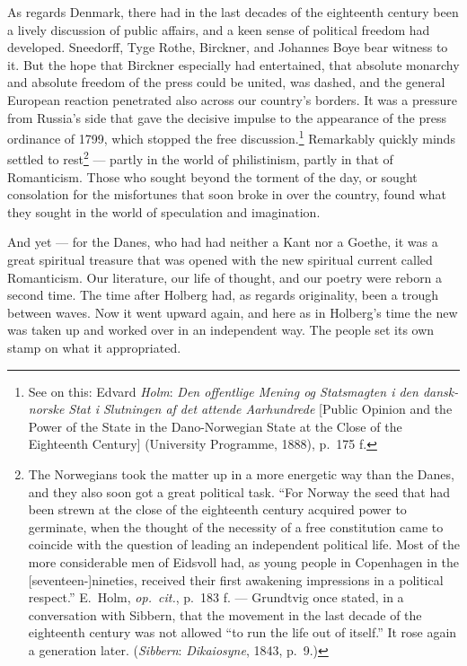 \documentclass[12pt,a4paper]{book}
\newcommand{\opage}[1]{\marginnote{\footnotesize\textit{[#1]}}}
\begin{document}

As regards Denmark, there had in the last decades of the eighteenth century been a
lively discussion of public affairs, and a keen sense of political freedom had
developed. Sneedorff, Tyge Rothe, Birckner, and Johannes Boye bear witness to it.
But the hope that Birckner especially had entertained, that absolute monarchy and
absolute freedom of the press could be united, was dashed, and the general European
reaction penetrated also across our country's borders. It was a pressure from
Russia's side that gave the decisive impulse to the appearance of the press
ordinance of 1799, which stopped the free discussion.\footnote{See on this: Edvard
\emph{Holm}: \emph{Den offentlige Mening og Statsmagten i den dansk-norske Stat i
Slutningen af det attende Aarhundrede} [Public Opinion and the Power of the State in
the Dano-Norwegian State at the Close of the Eighteenth Century] (University
Programme, 1888), p.~175 f.} Remarkably quickly minds settled to rest\footnote{The
Norwegians took the matter up in a more energetic way than the Danes, and they also
soon got a great political task. ``For Norway the seed that had been strewn at the
close of the eighteenth century acquired power to germinate, when the thought of the
necessity of a free constitution came to coincide with the question of leading an
independent political life. Most of the more considerable men of Eidsvoll had, as
young people in Copenhagen in the [seventeen-]nineties, received their first
awakening impressions in a political respect.'' E.\ Holm, \emph{op.\ cit.}, p.~183
f. --- Grundtvig once stated, in a conversation with Sibbern, that the movement in
the last decade of the eighteenth century was not allowed ``to run the life out of
itself.'' It rose again a generation later. (\emph{Sibbern}: \emph{Dikaiosyne}, 1843,
p.~9.)} --- partly in the world of philistinism, partly in that of Romanticism.
Those who sought beyond the torment of the day, or sought consolation for the
misfortunes that soon broke in over the country, found what they sought in the world
of speculation and imagination.

And yet --- for the Danes, who had had neither a Kant nor a Goethe, it was a great
spiritual treasure that was opened with the new spiritual current called
Romanticism. Our literature, our life of thought, and our poetry were \opage{42}reborn a
second time. The time after Holberg had, as regards originality, been a trough
between waves. Now it went upward again, and here as in Holberg's time the new was
taken up and worked over in an independent way. The people set its own stamp on what
it appropriated.
\end{document}
